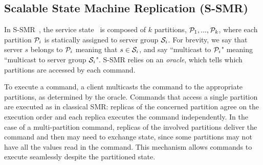 \subsection{Scalable State Machine Replication (S-SMR)}
\label{sec:ssmr}

%
%
%
In S-SMR~\cite{bezerra2014ssmr}, the service state \vvt\ is composed of $k$ partitions, $\mathcal{P}_1, ..., \mathcal{P}_k$, where each partition $\mathcal{P}_i$ is statically assigned to server group $\mathcal{S}_i$. 
For brevity, we say that server $s$ belongs to $\mathcal{P}_i$ meaning that $s \in \mathcal{S}_i$, and say ``multicast to $\mathcal{P}_i$" meaning ``multicast to server group $\mathcal{S}_i$".
S-SMR relies on an \emph{oracle}, which tells which partitions are accessed by each command.

To execute a command, a client multicasts the command to the appropriate partitions, as determined by the oracle.
Commands that access a single partition are executed as in classical SMR: replicas of the concerned partition agree on the execution order and each replica executes the command independently.
In the case of a multi-partition command, replicas of the involved partitions deliver the command and then may need to exchange state, since some partitions may not have all the values read in the command.
This mechanism allows commands to execute seamlessly despite the partitioned state.

